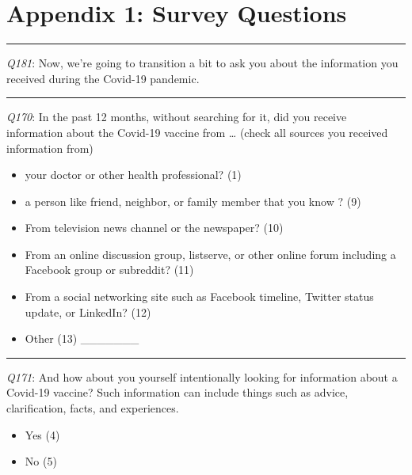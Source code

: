 \newpage

\hypertarget{appendix-1-survey-questions}{%
\section{Appendix 1: Survey Questions}\label{appendix-1-survey-questions}}

\begin{center}\rule{0.5\linewidth}{0.5pt}\end{center}

\emph{Q181}: Now, we're going to transition a bit to ask you about the information you received during the Covid-19 pandemic.

\begin{center}\rule{0.5\linewidth}{0.5pt}\end{center}

\emph{Q170}: In the past 12 months, without searching for it, did you receive information about the Covid-19 vaccine from \ldots{} (check all sources you received information from)

\begin{itemize}
\tightlist
\item
  your doctor or other health professional? (1)
\item
  a person like friend, neighbor, or family member that you know ? (9)
\item
  From television news channel or the newspaper? (10)
\item
  From an online discussion group, listserve, or other online forum including a Facebook group or subreddit? (11)
\item
  From a social networking site such as Facebook timeline, Twitter status update, or LinkedIn? (12)
\item
  Other (13) \_\_\_\_\_\_\_
\end{itemize}

\begin{center}\rule{0.5\linewidth}{0.5pt}\end{center}

\emph{Q171}: And how about you yourself intentionally looking for information about a Covid-19 vaccine? Such information can include things such as advice, clarification, facts, and experiences.

\begin{itemize}
\tightlist
\item
  Yes (4)
\item
  No (5)
\end{itemize}

